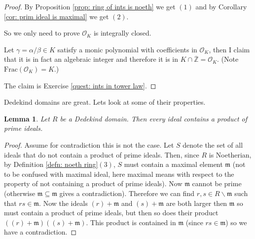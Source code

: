 \documentclass[11pt,a4paper]{report}
\theoremstyle{plain}
\newtheorem{lem}[subsection]{Lemma}
\theoremstyle{definition}
\theoremstyle{definition}
\newcommand{\ZZ}{\mathbb{Z}}
\def\gothm{\mathfrak{m}}
\def \a{\alpha}
\def \g {\gamma}
\def \OO {\mathcal{O}}
\def \ov{\overline}
\begin{document}
	
	\begin{proof}
		
		By 	Proposition \ref{prop: ring of ints is noeth} we get $(1)$ and by Corollary \ref{cor: prim ideal is maximal} we get $(2)$.
		
		So we only need to prove $\OO_K$ is integrally closed. 
		
		Let $\gamma=\a / \beta \in K$ satisfy a monic polynomial with coefficients in $\OO_K$, then I claim that it is in fact an algebraic integer and therefore it is in $K \cap \ov{\ZZ}=\OO_K$. (Note $\mathrm{Frac}(\OO_K)=K$.) 
		
		The claim is Exercise \ref{quest: ints in tower law}.
		
		
		
		
		
		
		
		
	\end{proof}
	
	Dedekind domains are great. Lets look at some of their properties.
	
	
	\begin{lem}\label{lem: ded dom ideal has prim ideals}
		Let $R$ be a Dedekind domain. Then every ideal contains a product of prime ideals.
	\end{lem}
	
	\begin{proof}
		Assume for contradiction this is not the case. Let $S$ denote the set of all ideals that do not contain a product of prime ideals. Then, since $R$ is Noetherian, by Definition \ref{defn: noeth ring}$(3)$, $S$ must contain a maximal element $\gothm$ (not to be confused with maximal ideal, here maximal means with respect to the property of not containing a product of prime ideals). Now $\gothm$ cannot be prime (otherwise $\gothm \subseteq \gothm$ gives a contradiction). Therefore we can find $r,s \in R \backslash \gothm$ such that $rs \in \gothm$. Now the ideals $(r)+\gothm$ and $(s)+\gothm$ are both larger then $\gothm$ so must contain a product of prime ideals, but then so does their product $((r)+\gothm)((s)+\gothm)$. This product is contained in $\gothm$ (since $rs \in \gothm$) so we have a contradiction.
	\end{proof}
	
\end{document}
